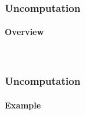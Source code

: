 \begin{frame}
	\frametitle{Uncomputation}
		\framesubtitle{Overview}

		{\normalsize
		\hspace{0.5cm}{General Steps}\\
		}
		

\end{frame}

\begin{frame}
	\frametitle{Uncomputation}
		\framesubtitle{Example}

		{\normalsize
		\hspace{0.5cm}{General Steps}\\
		}
		

\end{frame}

